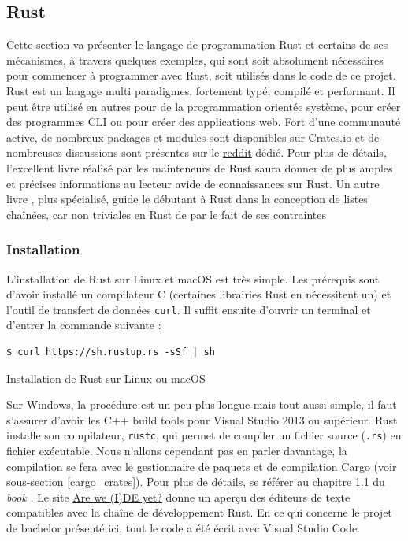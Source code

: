 \documentclass[a4paper, 12pt]{article}
\newenvironment{code}{\captionsetup{type=listing}}{}
\begin{document}
\subsection{Rust}
Cette section va présenter le langage de programmation Rust et certains de ses mécanismes, à 
travers quelques exemples, qui sont soit absolument nécessaires pour commencer à programmer avec 
Rust, soit utilisés dans le code de ce projet. Rust est un langage multi paradigmes, fortement typé, 
compilé et performant. Il peut être utilisé en autres pour de la programmation orientée système, 
pour créer des programmes CLI ou pour créer des applications web. Fort d'une communauté active, de 
nombreux packages et modules sont disponibles sur \href{https://crates.io}{Crates.io} \cite{ref33} 
et de nombreuses discussions sont présentes sur le \href{https://www.reddit.com/r/rust/}{reddit} 
\cite{ref34} dédié. Pour plus de détails, l'excellent livre \cite{ref0} réalisé par les mainteneurs 
de Rust saura donner de plus amples et précises informations au lecteur avide de connaissances sur 
Rust. Un autre livre \cite{ref2}, plus spécialisé, guide le débutant à Rust dans la conception de 
listes chaînées, car non triviales en Rust de par le fait de ses contraintes

\subsubsection{Installation}
L'installation de Rust sur Linux et macOS est très simple. Les prérequis sont d'avoir installé un 
compilateur C (certaines librairies Rust en nécessitent un) et l'outil de transfert de données 
\texttt{curl}. Il suffit ensuite d'ouvrir un terminal et d'entrer la commande suivante :
\bigbreak
\begin{code}
    \begin{verbatim}
$ curl https://sh.rustup.rs -sSf | sh
    \end{verbatim}
    \caption{Installation de Rust sur Linux ou macOS}
\end{code}
\bigbreak
Sur Windows, la procédure est un peu plus longue mais tout aussi simple, il faut s'assurer d'avoir 
les C++ build tools pour Visual Studio 2013 ou supérieur. Rust installe son compilateur, 
\texttt{rustc}, qui permet de compiler un fichier source (\texttt{.rs}) en 
fichier exécutable. Nous n'allons cependant pas en parler davantage, la compilation se fera avec 
le gestionnaire de paquets et de compilation Cargo (voir sous-section \ref{cargo_crates}).
Pour plus de détails, se référer au chapitre 1.1 du \textit{book} \cite{ref0}.
Le site \href{https://areweideyet.com/}{Are we (I)DE yet?} \cite{ref1} donne un aperçu des éditeurs 
de texte compatibles avec la chaîne de développement Rust. En ce qui concerne le projet de bachelor 
présenté ici, tout le code a été écrit avec Visual Studio Code.
\end{document}
